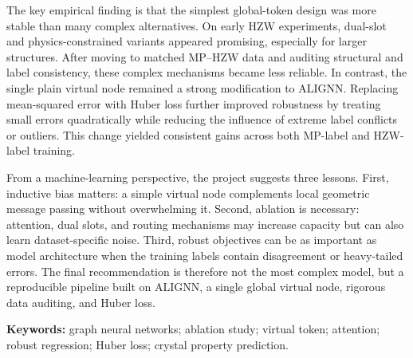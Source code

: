 \documentclass[11pt,a4paper]{article}
\begin{document}
The key empirical finding is that the simplest global-token design was more stable than many complex alternatives. On early HZW experiments, dual-slot and physics-constrained variants appeared promising, especially for larger structures. After moving to matched MP--HZW data and auditing structural and label consistency, these complex mechanisms became less reliable. In contrast, the single plain virtual node remained a strong modification to ALIGNN. Replacing mean-squared error with Huber loss further improved robustness by treating small errors quadratically while reducing the influence of extreme label conflicts or outliers. This change yielded consistent gains across both MP-label and HZW-label training.

From a machine-learning perspective, the project suggests three lessons. First, inductive bias matters: a simple virtual node complements local geometric message passing without overwhelming it. Second, ablation is necessary: attention, dual slots, and routing mechanisms may increase capacity but can also learn dataset-specific noise. Third, robust objectives can be as important as model architecture when the training labels contain disagreement or heavy-tailed errors. The final recommendation is therefore not the most complex model, but a reproducible pipeline built on ALIGNN, a single global virtual node, rigorous data auditing, and Huber loss.

\textbf{Keywords:} graph neural networks; ablation study; virtual token; attention; robust regression; Huber loss; crystal property prediction.
\end{document}

